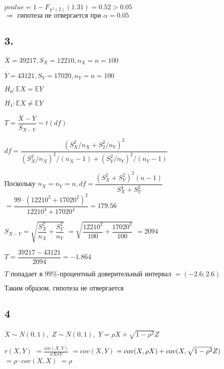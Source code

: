 \documentclass[13pt,a4paper]{scrartcl}
\def\E{\exists\;}
\begin{document}
\(pvalue = 1 - F_{\chi^2(2)}(1.31) = 0.52 > 0.05\)
\(\Rightarrow \text{ гипотеза }\allowbreak \text{не }\allowbreak \text{отвергается }\allowbreak \text{при }\allowbreak \alpha = 0.05\)

\subsection*{ 3.}

\def\X{\overline{X}}
\def\Y{\overline{Y}}
\def\E{\mathbb{E}}

\(\X = 39217, S_X = 12210, n_X = n = 100\)

\(\Y = 43121, S_Y = 17020, n_Y = n = 100\)

\(H_0: \E X = \E Y\)

\(H_1: \E X \neq  \E Y\)

\(T = \dfrac{\X - \Y }{S_{X - Y} } \sim  t(df)\)

\medskip
\def\num{(S_X^2 / n_X + S_2^2 / n_Y)^2}
\def\denum{(S_X^2 / n_X)^2 / (n_X - 1) + (S_Y^2 / n_Y)^2 / (n_Y - 1)}
\(df = \dfrac{\num }{\denum }\)

\(\text{Поскольку }\allowbreak n_X = n_Y = n, df = \dfrac{(S_X^2 + S_Y^2)^2 (n - 1) }{S_X^4 + S_Y^2 }\)
\(= \dfrac{99\cdot  (12210^2 + 17020^2)^2 }{12210^4 + 17020^4 } = 179.56\)
\medskip

\(S_{X - Y} = \sqrt{ \dfrac{S_X^2 }{n_X } + \dfrac{S_Y^2 }{n_Y } }\)
\(= \sqrt{ \dfrac{12210^2 }{100 } + \dfrac{17020^2 }{100 } }\)
\(= 2094\)
\medskip

\(T = \dfrac{39217 - 43121 }{2094 } = -1.864\)

\medskip
\(T\text{ попадает }\allowbreak \text{в }\allowbreak 99\%\text{-процентный }\allowbreak \text{доверительный }\allowbreak \text{интервал }\allowbreak = (-2.6; 2.6)\)

\(\text{Таким }\allowbreak \text{образом, }\allowbreak \text{гипотеза }\allowbreak \text{не }\allowbreak \text{отвергается}\allowbreak \)

\subsection*{ 4\allowbreak {}\allowbreak {}\allowbreak {}\allowbreak {}\allowbreak {}\allowbreak {}\allowbreak }

\def\tmp{\sqrt{1 - \rho^2}}

\(X \sim  N(0, 1),\)
\(Z \sim  N(0, 1),\)
\(Y = \rho X + \tmp Z\)

\(r(X, Y)\)
\(= \frac{cov(X, Y) }{\sigma X \sigma Y }\)
\(= cov(X, Y)\)
\(= cov(X, \rho X) + cov(X, \tmp Z) \\\)
\(= \rho\cdot  cov(X, X)\)
\(= \rho\)
\end{document}
